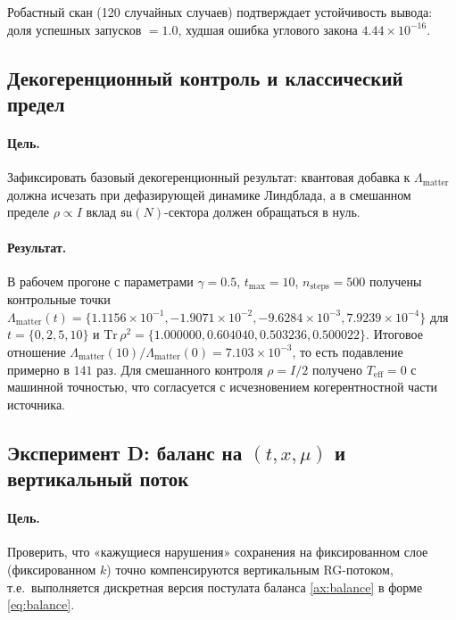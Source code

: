 \documentclass[11pt,a4paper]{article}
\theoremstyle{definition}
\theoremstyle{plain}
\theoremstyle{remark}
\begin{document}
Робастный скан (120 случайных случаев) подтверждает устойчивость вывода:
доля успешных запусков $=1.0$, худшая ошибка углового закона $4.44\times 10^{-16}$.

\subsection{Декогеренционный контроль и классический предел}
\label{sec:numerics:wave1decoherence}

\paragraph{Цель.}
Зафиксировать базовый декогеренционный результат: квантовая добавка к $\Lambda_{\mathrm{matter}}$
должна исчезать при дефазирующей динамике Линдблада, а в смешанном пределе $\rho\propto I$ вклад
$\mathfrak{su}(N)$-сектора должен обращаться в нуль.

\paragraph{Результат.}
В рабочем прогоне с параметрами $\gamma=0.5$, $t_{\max}=10$, $n_{\text{steps}}=500$
получены контрольные точки
$\Lambda_{\mathrm{matter}}(t)=\{1.1156\times10^{-1},-1.9071\times10^{-2},-9.6284\times10^{-3},7.9239\times10^{-4}\}$
для $t=\{0,2,5,10\}$ и
$\mathrm{Tr}\,\rho^2=\{1.000000,0.604040,0.503236,0.500022\}$.
Итоговое отношение
$\Lambda_{\mathrm{matter}}(10)/\Lambda_{\mathrm{matter}}(0)=7.103\times10^{-3}$,
то есть подавление примерно в $141$ раз.
Для смешанного контроля $\rho=I/2$ получено $T_{\mathrm{eff}}=0$ с машинной точностью,
что согласуется с исчезновением когерентностной части источника.

\subsection[Эксперимент D: баланс на (t,x,mu) и вертикальный поток]{Эксперимент D: баланс на $(t,x,\mu)$ и вертикальный поток}
\label{sec:numerics:D}

\paragraph{Цель.}
Проверить, что «кажущиеся нарушения» сохранения на фиксированном слое (фиксированном $k$)
точно компенсируются вертикальным RG-потоком, т.е.\ выполняется дискретная версия постулата баланса \cref{ax:balance}
в форме \cref{eq:balance}.
\end{document}
